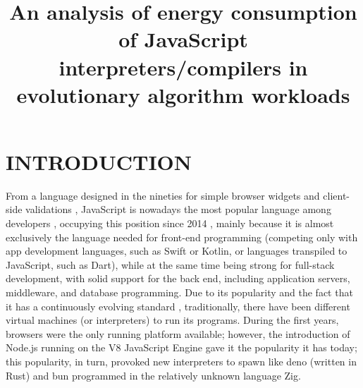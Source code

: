 \documentclass[a4paper,twoside]{article}
\begin{document}
\title{An analysis of energy consumption of JavaScript interpreters/compilers in evolutionary algorithm workloads}

\author{
}


\abstract{
}

\onecolumn \maketitle \normalsize \setcounter{footnote}{0} \vfill

\section{\uppercase{Introduction}}
\label{sec:introduction}


From a language designed in the nineties for simple browser widgets and
client-side validations \cite{goodman2007javascript,flanagan1998javascript},
JavaScript is nowadays the most popular language among developers
\cite{ogrady22:ranking}, occupying this position since 2014
\cite{ogrady14:ranking}, mainly because it is almost exclusively the language
needed for front-end programming (competing only with app development languages,
such as Swift or Kotlin, or languages transpiled to JavaScript, such as Dart),
while at the same time being strong for full-stack development, with solid
support for the back end, including application servers, middleware, and
database programming. Due to its popularity and the fact that it has a
continuously evolving standard \cite{ecma1999262}, traditionally, there have
been different virtual machines (or interpreters) to run its programs. During
the first years, browsers were the only running platform available; however, the
introduction of Node.js running on the V8 JavaScript Engine \cite{5617064} gave
it the popularity it has today; this popularity, in turn, provoked new
interpreters to spawn like {\sf deno} \cite{runtimeintroducing} (written in
Rust) and {\sf bun} \cite{bun} programmed in the relatively unknown language
Zig.
\end{document}
